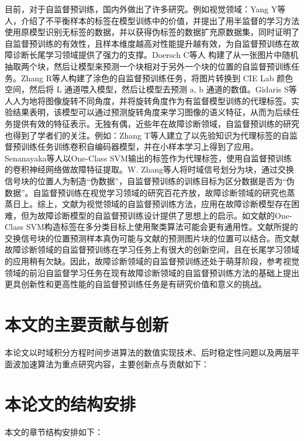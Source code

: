 \documentclass[master]{thesis-uestc}
\begin{document}
目前，对于自监督预训练，国内外做出了许多研究。例如视觉领域：Yang Y等人，介绍了不平衡样本的标签在模型训练中的价值，并提出了用半监督的学习方法使用原模型识别无标签的数据，并以获得伪标签的数据扩充原数据集，同时证明了自监督预训练的有效性，且样本维度越高对性能提升越有效，为自监督预训练在故障诊断长尾学习领域提供了强力的支撑。Doersch C等人 构建了从一张图片中随机抽取两个块，然后让模型来预测一个块相对于另外一个块的位置的自监督预训练任务。Zhang R等人构建了涂色的自监督预训练任务，将图片转换到 CIE Lab 颜色空间，然后将 L 通道喂入模型，然后让模型去预测 a, b 通道的数值。Gidaris S等人人为地将图像旋转不同角度，并将旋转角度作为有监督模型训练的代理标签。实验结果表明，该模型可以通过预测旋转角度来学习图像的语义特征，从而为后续任务提供有效的特征表示。无独有偶，近些年在故障诊断领域，自监督预训练的研究也得到了学者们的关注。例如：Zhang T等人建立了以先验知识为代理标签的自监督预训练任务训练卷积自编码器模型，并在小样本学习上得到了应用。Senanayaka等人以One-Class SVM输出的标签作为代理标签，使用自监督预训练的卷积神经网络做故障特征提取。W. Zhang等人将时域信号划分为块，通过交换信号块的位置人为制造“伪数据”，自监督预训练的训练目标为区分数据是否为“伪数据”。自监督预训练在视觉学习领域的研究百花齐放，故障诊断领域的研究也蒸蒸日上。综上，文献\cite{doersch2015unsupervised,zhang2016colorful,gidaris2018unsupervised}为视觉领域的自监督预训练方法，应用在故障诊断模型存在困难，但为故障诊断模型的自监督预训练设计提供了思想上的启示。如文献\cite{senanayaka2020toward}的One-Class SVM构造标签在多分类目标上使用聚类算法可能会更有通用性。文献\cite{zhang2021federated}所提的交换信号块的位置预测样本真伪可能与文献\cite{doersch2015unsupervised}的预测图片块的位置可以结合。而文献\cite{zhang2022prior,senanayaka2020toward,zhang2021federated}故障诊断领域的自监督预训练在学习任务上有很大的创新空间，且在长尾学习领域的应用稍有欠缺。因此，故障诊断领域的自监督预训练还处于萌芽阶段，参考视觉领域的前沿自监督学习任务在现有故障诊断领域的自监督预训练方法的基础上提出更具创新性和更高性能的自监督预训练任务是有研究价值和意义的挑战。

\section{本文的主要贡献与创新}
本论文以时域积分方程时间步进算法的数值实现技术、后时稳定性问题以及两层平面波加速算法为重点研究内容，主要创新点与贡献如下：

\section{本论文的结构安排}
本文的章节结构安排如下：
\end{document}
